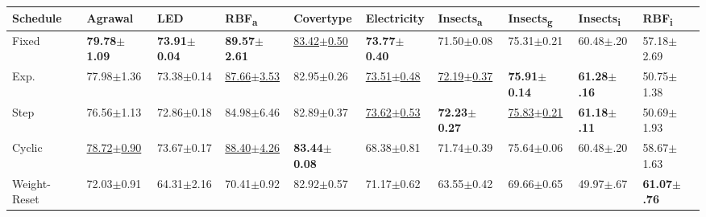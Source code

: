 \documentclass{article} %
\begin{document}
\begin{center}
   \begin{sideways}
      \begin{minipage}{0.9\textheight}
         \scriptsize
         \centering
         \begin{tabular}{llllllllll}
            \toprule
            Schedule                  & Agrawal                    & LED                      & RBF\textsubscript{a}       & Covertype                  & Electricity                & Insects\textsubscript{a}   & Insects\textsubscript{g}   & Insects\textsubscript{i} & RBF\textsubscript{i}    \\ \midrule
            Fixed                     & \bfseries 79.78$\pm$1.09   & \bfseries 73.91$\pm$0.04 & \bfseries 89.57$\pm$2.61   & \underline{83.42$\pm$0.50} & \bfseries 73.77$\pm$0.40   & 71.50$\pm$0.08             & 75.31$\pm$0.21             & 60.48$\pm$.20            & 57.18$\pm$2.69          \\
            Exp.                      & 77.98$\pm$1.36             & 73.38$\pm$0.14           & \underline{87.66$\pm$3.53} & 82.95$\pm$0.26             & \underline{73.51$\pm$0.48} & \underline{72.19$\pm$0.37} & \bfseries 75.91$\pm$0.14   & \bfseries 61.28$\pm$.16  & 50.75$\pm$1.38          \\
            Step                      & 76.56$\pm$1.13             & 72.86$\pm$0.18           & 84.98$\pm$6.46             & 82.89$\pm$0.37             & \underline{73.62$\pm$0.53} & \bfseries 72.23$\pm$0.27   & \underline{75.83$\pm$0.21} & \bfseries 61.18$\pm$.11  & 50.69$\pm$1.93          \\
            Cyclic                    & \underline{78.72$\pm$0.90} & 73.67$\pm$0.17           & \underline{88.40$\pm$4.26} & \bfseries 83.44$\pm$0.08   & 68.38$\pm$0.81             & 71.74$\pm$0.39             & 75.64$\pm$0.06             & 60.48$\pm$.20            & 58.67$\pm$1.63          \\
            Weight-Reset              & 72.03$\pm$0.91             & 64.31$\pm$2.16           & 70.41$\pm$0.92             & 82.92$\pm$0.57             & 71.17$\pm$0.62             & 63.55$\pm$0.42             & 69.66$\pm$0.65             & 49.97$\pm$.67            & \bfseries 61.07$\pm$.76 \\

\end{tabular}
\end{minipage}
\end{sideways}
\end{center}
\end{document}
